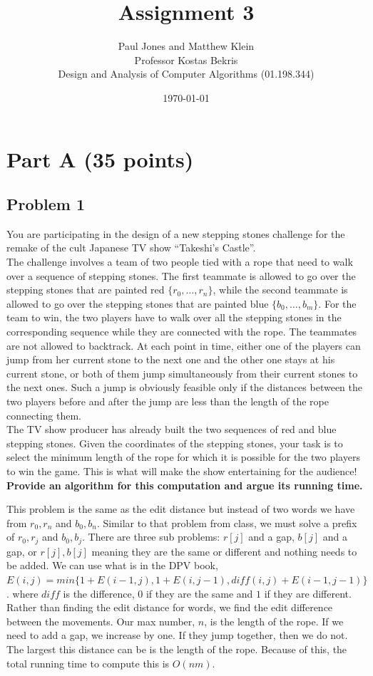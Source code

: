 \documentclass[11pt]{article}
\title{Assignment 3}
\author{Paul Jones and Matthew Klein \\
		Professor Kostas Bekris\\
		Design and Analysis of Computer Algorithms (01.198.344)}
\date{\today}
\begin{document}
\pagebreak

\section*{Part A (35 points)}

\subsection*{Problem 1} You are participating in the design of a
new stepping stones challenge for the remake of the cult Japanese TV
show ``Takeshi's Castle''.\\

\noindent The challenge involves a team of two people tied with a rope
that need to walk over a sequence of stepping stones. The first
teammate is allowed to go over the stepping stones that are painted
red $\{r_0, \ldots, r_n\}$, while the second teammate is allowed to go
over the stepping stones that are painted blue $\{b_0, \ldots,
b_m\}$. For the team to win, the two players have to walk over all the
stepping stones in the corresponding sequence while they are connected
with the rope. The teammates are not allowed to backtrack. At each
point in time, either one of the players can jump from her current
stone to the next one and the other one stays at his current stone, or
both of them jump simultaneously from their current stones to the next
ones. Such a jump is obviously feasible only if the distances between
the two players before and after the jump are less than the length of
the rope connecting them.\\

\noindent The TV show producer has already built the two sequences of
red and blue stepping stones. Given the coordinates of the stepping
stones, your task is to select the minimum length of the rope for
which it is possible for the two players to win the game. This is what
will make the show entertaining for the audience!\\

\noindent \textbf{Provide an algorithm for this computation and argue its
running time.}


This problem is the same as the edit distance but instead of two words we have from $r_0,r_n$ and $b_0,b_n$. Similar to that problem from class, we must solve a prefix of $r_0,r_j$ and $b_0,b_j$. There are three sub problems: $r[j]$ and a gap, $b[j]$ and a gap, or $r[j],b[j]$ meaning they are the same or different and nothing needs to be added. We can use what is in the DPV book, $E(i,j) = min\{1+E(i-1,j), 1+E(i,j-1), diff(i,j)+E(i-1,j-1)\}$. where $diff$ is the difference, $0$ if they are the same and $1$ if they are different. Rather than finding the edit distance for words, we find the edit difference between the movements. Our max number, $n$, is the length of the rope. If we need to add a gap, we increase by one. If they jump together, then we do not. The largest this distance can be is the length of the rope. Because of this, the total running time to compute this is $O(nm)$.
\end{document}
